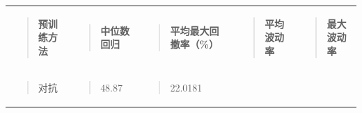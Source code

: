 \documentclass[UTF8]{ctexart}
\newcounter{none} %
\begin{document}
{\def\LTcaptype{none} %
\begin{longtable}[]{@{}
  >{\raggedright\arraybackslash}p{}
  >{\raggedright\arraybackslash}p{}
  >{\raggedright\arraybackslash}p{}
  >{\raggedright\arraybackslash}p{}
  >{\raggedright\arraybackslash}p{}@{}}
\toprule\noalign{}
\endhead
\bottomrule\noalign{}
\endlastfoot
\begin{minipage}[t]{\linewidth}\raggedright
\begin{quote}
\textbf{预训练方法}
\end{quote}
\end{minipage} & \begin{minipage}[t]{\linewidth}\raggedright
\begin{quote}
\textbf{中位数回归}
\end{quote}
\end{minipage} & \begin{minipage}[t]{\linewidth}\raggedright
\begin{quote}
\textbf{平均最大回撤率（\%）}
\end{quote}
\end{minipage} & \begin{minipage}[t]{\linewidth}\raggedright
\begin{quote}
\textbf{平均波动率}
\end{quote}
\end{minipage} & \begin{minipage}[t]{\linewidth}\raggedright
\begin{quote}
\textbf{最大波动率}
\end{quote}
\end{minipage} \\
\begin{minipage}[t]{\linewidth}\raggedright
\begin{quote}
对抗
\end{quote}
\end{minipage} & \begin{minipage}[t]{\linewidth}\raggedright
\begin{quote}
48.87
\end{quote}
\end{minipage} & \begin{minipage}[t]{\linewidth}\raggedright
\begin{quote}
22.0181

\end{quote}
\end{minipage}
\end{longtable}}
\end{document}

